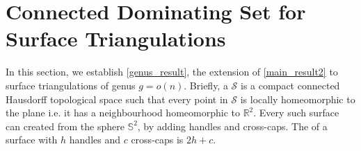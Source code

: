 \section{Connected Dominating Set for Surface Triangulations}
\label{bounded_genus}
In this section, we establish \cref{genus_result}, the extension of \cref{main_result2} to surface triangulations of genus $g = o(n)$.
Briefly, a  $\mathcal{S}$ is a compact connected Hausdorff topological space such that every point in $\mathcal{S}$ is locally homeomorphic to the plane i.e. it has a neighbourhood homeomorphic to $\mathbb{R}^2$. Every such surface can created from the sphere $\mathbb{S}^2$, by adding handles and cross-caps. The  of a surface with $h$ handles and $c$ cross-caps is $2h+c$.

